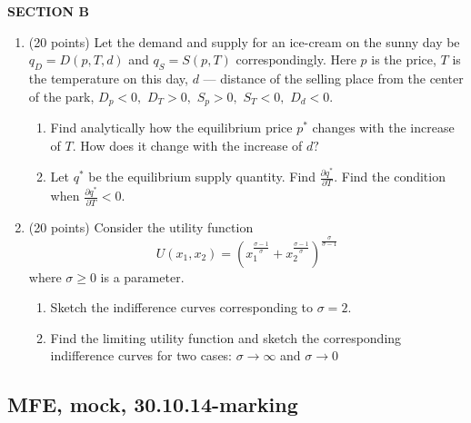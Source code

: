 \textbf{SECTION B}

\begin{enumerate}[resume]
\item (20 points) Let the demand and supply for an ice-cream on the sunny day be $q_D=D(p, T, d)$ and $q_S=S(p,T)$ correspondingly. Here $p$ is the price, $T$ is the temperature on this day, $d$ --- distance of the selling place from the center of the park, $D_p<0,$ $D_T>0,$ $S_p>0,$ $S_T<0,$ $D_d<0.$

\begin{enumerate}
\item Find analytically how the equilibrium price $p^{\ast}$ changes with the increase of $T.$ How does it change with the increase of $d?$
\item Let $q^{\ast}$ be the equilibrium supply quantity. Find $\frac{\partial{q^{\ast}}}{\partial T}.$ Find the condition when $\frac{\partial{q^{\ast}}}{\partial T}<0.$
\end{enumerate}

\item (20 points) Consider the utility function
$$
U(x_1, x_2) = \left(x_1^\frac{\sigma-1}{\sigma}+x_2^\frac{\sigma-1}{\sigma}\right)^\frac{\sigma}{\sigma-1}
$$
where $\sigma \geq 0$ is a parameter.

\begin{enumerate}
\item Sketch the indifference curves corresponding to $\sigma=2$.
\item Find the limiting utility function and sketch the corresponding indifference curves for two cases: $\sigma \rightarrow \infty$ and $\sigma \rightarrow 0$
\end{enumerate}
\end{enumerate}

\subsection{MFE, mock, 30.10.14-marking}

